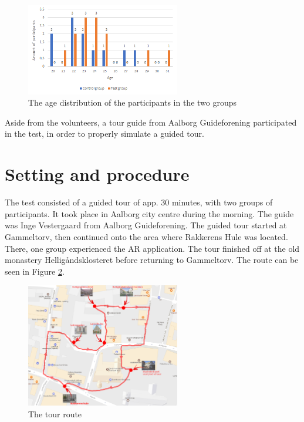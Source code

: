 \begin{figure}[h!]
  \centering
  \includegraphics[width=0.6\textwidth]{figures/agedistribution.png}
  \caption{The age distribution of the participants in the two groups}\label{fig:age}
\end{figure}

Aside from the volunteers, a tour guide from Aalborg Guideforening participated in the test, in order to properly simulate a guided tour.

\section{Setting and procedure}
The test consisted of a guided tour of app. 30 minutes, with two groups of participants. It took place in Aalborg city centre during the morning. The guide was Inge Vestergaard from Aalborg Guideforening. The guided tour started at Gammeltorv, then continued onto the area where Rakkerens Hule was located. There, one group experienced the AR application. The tour finished off at the old monastery Helligåndsklosteret before returning to Gammeltorv. The route can be seen in Figure \ref{fig:map}. 

\begin{figure}[h!]
   \centering
   \includegraphics[width=0.6\textwidth]{figures/Tour_map.png}
   \caption{The tour route}\label{fig:map}
\end{figure}


